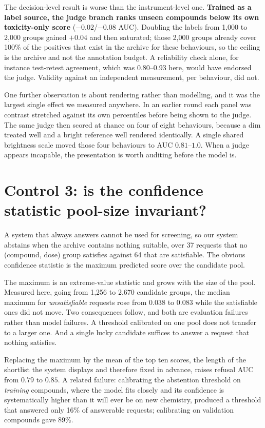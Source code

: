 \documentclass[letterpaper]{article}
\begin{document}
The decision-level result is worse than the instrument-level one. \textbf{Trained as a
label source, the judge branch ranks unseen compounds below its own toxicity-only
score} ($-0.02$/$-0.08$ AUC). Doubling the labels from 1{,}000 to 2{,}000 groups gained
$+0.04$ and then saturated; those 2{,}000 groups already cover 100\% of the positives
that exist in the archive for these behaviours, so the ceiling is the archive and not
the annotation budget. A reliability check alone, for instance test-retest agreement,
which was 0.80--0.93 here, would have endorsed the judge. Validity against an
independent measurement, per behaviour, did not.

One further observation is about rendering rather than modelling, and it was the
largest single effect we measured anywhere. In an earlier round each panel was contrast
stretched against its own percentiles before being shown to the judge. The same judge
then scored at chance on four of eight behaviours, because a dim treated well and a
bright reference well rendered identically. A single shared brightness scale moved those
four behaviours to AUC $0.81$--$1.0$. When a judge appears incapable, the presentation
is worth auditing before the model is.

\section{Control 3: is the confidence statistic pool-size invariant?}

A system that always answers cannot be used for screening, so our system abstains when
the archive contains nothing suitable, over 37 requests that no (compound, dose) group
satisfies against 64 that are satisfiable. The obvious confidence statistic is the
maximum predicted score over the candidate pool.

The maximum is an extreme-value statistic and grows with the size of the pool.
Measured here, going from 1{,}256 to 2{,}670 candidate groups, the median maximum for
\emph{unsatisfiable} requests rose from $0.038$ to $0.083$ while the satisfiable ones
did not move. Two consequences follow, and both are evaluation failures rather than
model failures. A threshold calibrated on one pool does not transfer to a larger one.
And a single lucky candidate suffices to answer a request that nothing satisfies.

Replacing the maximum by the mean of the top ten scores, the length of the shortlist
the system displays and therefore fixed in advance, raises refusal AUC from $0.79$ to
$0.85$. A related failure: calibrating the abstention threshold on \emph{training}
compounds, where the model fits closely and its confidence is systematically higher
than it will ever be on new chemistry, produced a threshold that answered only 16\% of
answerable requests; calibrating on validation compounds gave 89\%.
\end{document}
